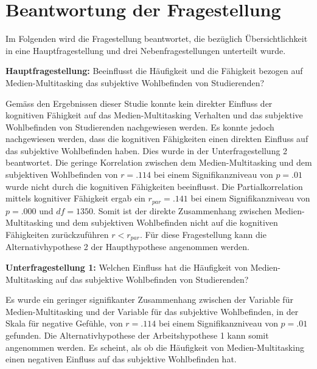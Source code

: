 \section{Beantwortung der Fragestellung}\label{section.diskussion.fragestellung}
Im Folgenden wird die Fragestellung beantwortet, die bezüglich Übersichtlichkeit in eine Hauptfragestellung und drei Nebenfragestellungen unterteilt wurde. 
\par
\textbf{Hauptfragestellung:} Beeinflusst die Häufigkeit und die Fähigkeit bezogen auf Medien-Multitasking das subjektive Wohlbefinden von Studierenden?
\par
Gemäss den Ergebnissen dieser Studie konnte kein direkter Einfluss der kognitiven Fähigkeit auf das Medien-Multitasking Verhalten und das subjektive Wohlbefinden von Studierenden nachgewiesen werden. Es konnte jedoch nachgewiesen werden, dass die kognitiven Fähigkeiten einen direkten Einfluss auf das subjektive Wohlbefinden haben. Dies wurde in der Unterfragestellung 2 beantwortet. Die geringe Korrelation zwischen dem Medien-Multitasking und dem subjektiven Wohlbefinden von $r=.114$ bei einem Signifikanzniveau von $p=.01$ wurde nicht durch die kognitiven Fähigkeiten beeinflusst. Die Partialkorrelation mittels kognitiver Fähigkeit ergab ein $r_{par}=.141$ bei einem Signifikanzniveau von $p=.000$ und $df=1350$. Somit ist der direkte Zusammenhang zwischen Medien-Multitasking und dem subjektiven Wohlbefinden nicht auf die kognitiven Fähigkeiten zurückzuführen $r<r_{par}$. Für diese Fragestellung kann die Alternativhypothese 2 der Haupthypothese angenommen werden.
\par
\textbf{Unterfragestellung 1:} Welchen Einfluss hat die Häufigkeit von Medien-Multitasking auf das subjektive Wohlbefinden von Studierenden?
\par
Es wurde ein geringer signifikanter Zusammenhang zwischen der Variable für Medien-Multitasking und der Variable für das subjektive Wohlbefinden, in der Skala für negative Gefühle, von $r=.114$ bei einem Signifikanzniveau von $p=.01$ gefunden. Die Alternativhypothese der Arbeitshypothese 1 kann somit angenommen werden. Es scheint, als ob die Häufigkeit von Medien-Multitasking einen negativen Einfluss auf das subjektive Wohlbefinden hat. \\
